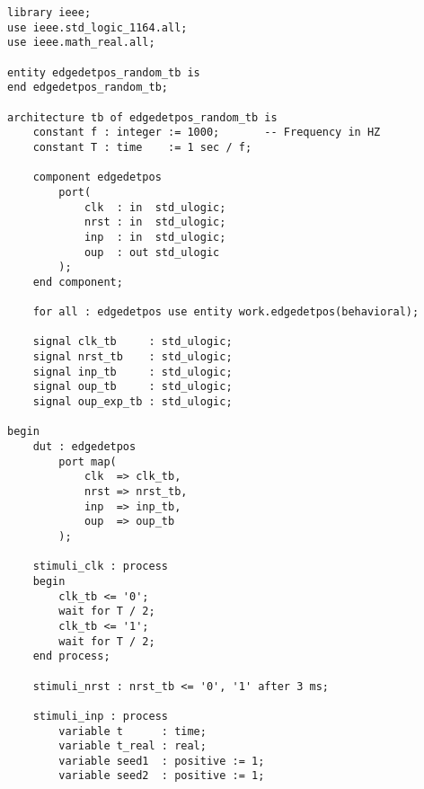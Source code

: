 \begin{minipage}{0.01\textwidth}
	\text{ } %
\end{minipage}
\begin{minipage}{0.48\textwidth}
	\begin{lstlisting}
library ieee;
use ieee.std_logic_1164.all;
use ieee.math_real.all;

entity edgedetpos_random_tb is
end edgedetpos_random_tb;

architecture tb of edgedetpos_random_tb is
	constant f : integer := 1000;       -- Frequency in HZ
	constant T : time    := 1 sec / f;

	component edgedetpos
		port(
			clk  : in  std_ulogic;
			nrst : in  std_ulogic;
			inp  : in  std_ulogic;
			oup  : out std_ulogic
		);
	end component;

	for all : edgedetpos use entity work.edgedetpos(behavioral);

	signal clk_tb     : std_ulogic;
	signal nrst_tb    : std_ulogic;
	signal inp_tb     : std_ulogic;
	signal oup_tb     : std_ulogic;
	signal oup_exp_tb : std_ulogic;

begin
	dut : edgedetpos
		port map(
			clk  => clk_tb,
			nrst => nrst_tb,
			inp  => inp_tb,
			oup  => oup_tb
		);

	stimuli_clk : process
	begin
		clk_tb <= '0';
		wait for T / 2;
		clk_tb <= '1';
		wait for T / 2;
	end process;

	stimuli_nrst : nrst_tb <= '0', '1' after 3 ms;
	
	stimuli_inp : process
		variable t      : time;
		variable t_real : real;
		variable seed1  : positive := 1;
		variable seed2  : positive := 1;	
	\end{lstlisting}
\end{minipage}
\begin{minipage}{0.02\textwidth}
	\text{ } %
\end{minipage}

